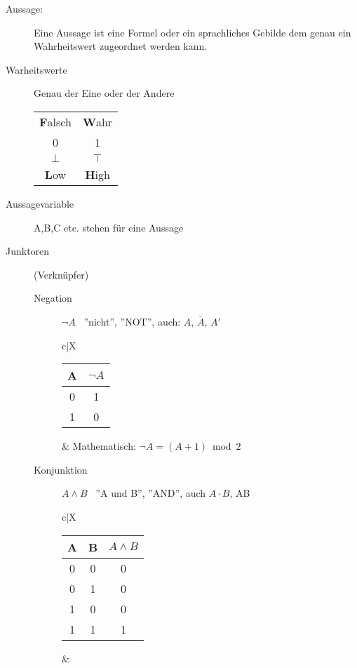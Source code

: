 \begin{description}
    \item[Aussage:] Eine Aussage ist eine Formel oder ein sprachliches Gebilde dem genau ein Wahrheitswert zugeordnet werden kann.

    \item[Warheitswerte] Genau der Eine oder der Andere \\
    \begin{tabular}{c|c}
        \textbf{F}alsch & \textbf{W}ahr \\
        0               & 1             \\
        $\bot$          & $\top$        \\
        \textbf{L}ow    & \textbf{H}igh
    \end{tabular}
    \item[Aussagevariable] A,B,C etc. stehen für eine Aussage
    \item[Junktoren] (Verknüpfer)
    \begin{description}
        \item[Negation] $\neg A$ \, ''nicht'', ''NOT'', auch: $A$, $\bar{A}$, $A'$ \\
        \begin{tabularx}{\linewidth}{c|X}
            \begin{tabular}[t]{c|c}
                A & $\neg A$ \\ \hline
                0 & 1        \\
                1 & 0
            \end{tabular} &
            Mathematisch: $\neg A = (A + 1) \bmod 2$ \\ \hline
        \end{tabularx}
        \item[Konjunktion] $A\wedge B$ \, ''A und B'', ''AND'', auch $A\cdot B$, AB \\
        \begin{tabularx}{\linewidth}{c|X}
            \begin{tabular}[t]{c|c||c}
                A & B & $A \wedge B$ \\ \hline\hline
                0 & 0 & 0            \\ \hline
                0 & 1 & 0            \\ \hline
                1 & 0 & 0            \\ \hline
                1 & 1 & 1
            \end{tabular} &
            \begin{tabular}[t]{ll}

\end{tabular}
\end{tabularx}
\end{description}
\end{description}
